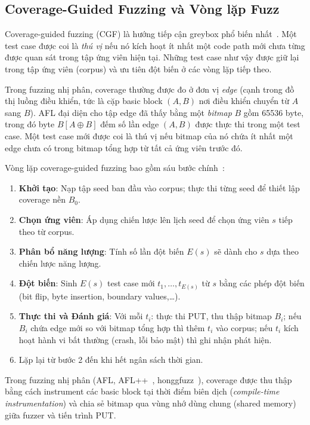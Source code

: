 \subsection{Coverage-Guided Fuzzing và Vòng lặp Fuzz}
\label{subsec:cgf-loop}

Coverage-guided fuzzing (CGF) là hướng tiếp cận greybox phổ biến
nhất~\cite{li2018fuzzing, manes2021art}. Một test case được coi là
\emph{thú vị} nếu nó kích hoạt ít nhất một code path mới chưa từng được
quan sát trong tập ứng viên hiện tại. Những test case như vậy được giữ lại
trong tập ứng viên (corpus) và ưu tiên đột biến ở các vòng lặp tiếp theo.

Trong fuzzing nhị phân, coverage thường được đo ở đơn vị \emph{edge}
(cạnh trong đồ thị luồng điều khiển, tức là cặp basic block \((A, B)\) nơi
điều khiển chuyển từ $A$ sang $B$). AFL đại diện cho tập edge đã thấy bằng
một \emph{bitmap} $B$ gồm 65536 byte, trong đó byte $B[A \oplus B]$ đếm số
lần edge $(A, B)$ được thực thi trong một test case. Một test case mới được
coi là thú vị nếu bitmap của nó chứa ít nhất một edge chưa có trong bitmap
tổng hợp từ tất cả ứng viên trước đó.

Vòng lặp coverage-guided fuzzing bao gồm sáu bước chính~\cite{manes2021art}:
\begin{enumerate}
    \item \textbf{Khởi tạo}: Nạp tập seed ban đầu vào corpus; thực thi từng
    seed để thiết lập coverage nền $B_0$.
    \item \textbf{Chọn ứng viên}: Áp dụng chiến lược lên lịch seed để chọn
    ứng viên $s$ tiếp theo từ corpus.
    \item \textbf{Phân bổ năng lượng}: Tính số lần đột biến $E(s)$ sẽ dành
    cho $s$ dựa theo chiến lược năng lượng.
    \item \textbf{Đột biến}: Sinh $E(s)$ test case mới $t_1, \ldots, t_{E(s)}$
    từ $s$ bằng các phép đột biến (bit flip, byte insertion, boundary values,\ldots).
    \item \textbf{Thực thi và Đánh giá}: Với mỗi $t_i$: thực thi PUT, thu
    thập bitmap $B_i$; nếu $B_i$ chứa edge mới so với bitmap tổng hợp thì
    thêm $t_i$ vào corpus; nếu $t_i$ kích hoạt hành vi bất thường (crash, lỗi
    bảo mật) thì ghi nhận phát hiện.
    \item Lặp lại từ bước 2 đến khi hết ngân sách thời gian.
\end{enumerate}

Trong fuzzing nhị phân (AFL, AFL++~\cite{fioraldi2020afl, zalewski2014afl},
honggfuzz~\cite{google2023honggfuzz}), coverage được thu thập bằng cách
instrument các basic block tại thời điểm biên dịch (\emph{compile-time
instrumentation}) và chia sẻ bitmap qua vùng nhớ dùng chung (shared memory)
giữa fuzzer và tiến trình PUT.

